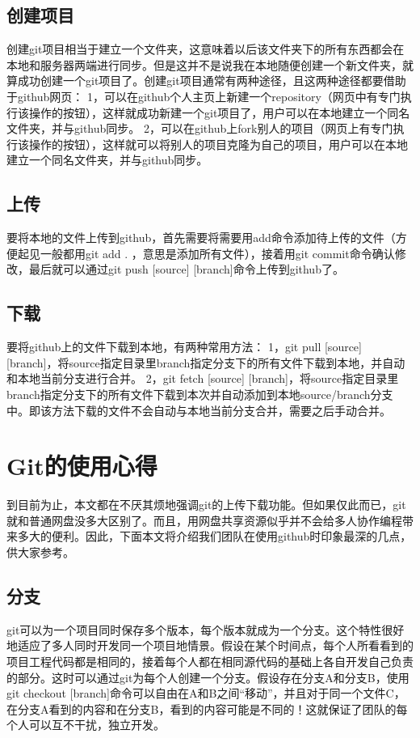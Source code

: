 \documentclass [a4paper,11pt]{article}
\begin{document}
\subsection{创建项目}
       创建git项目相当于建立一个文件夹，这意味着以后该文件夹下的所有东西都会在本地和服务器两端进行同步。但是这并不是说我在本地随便创建一个新文件夹，就算成功创建一个git项目了。创建git项目通常有两种途径，且这两种途径都要借助于github网页：
        1，可以在github个人主页上新建一个repository（网页中有专门执行该操作的按钮），这样就成功新建一个git项目了，用户可以在本地建立一个同名文件夹，并与github同步。
        2，可以在github上fork别人的项目（网页上有专门执行该操作的按钮），这样就可以将别人的项目克隆为自己的项目，用户可以在本地建立一个同名文件夹，并与github同步。

\subsection{上传}
       要将本地的文件上传到github，首先需要将需要用add命令添加待上传的文件（方便起见一般都用git add . ，意思是添加所有文件），接着用git commit命令确认修改，最后就可以通过git push [source] [branch]命令上传到github了。

\subsection{下载}
       要将github上的文件下载到本地，有两种常用方法：
       1，git pull [source] [branch]，将source指定目录里branch指定分支下的所有文件下载到本地，并自动和本地当前分支进行合并。
       2，git fetch [source] [branch]，将source指定目录里branch指定分支下的所有文件下载到本次并自动添加到本地source/branch分支中。即该方法下载的文件不会自动与本地当前分支合并，需要之后手动合并。

\section{Git的使用心得}
      到目前为止，本文都在不厌其烦地强调git的上传下载功能。但如果仅此而已，git就和普通网盘没多大区别了。而且，用网盘共享资源似乎并不会给多人协作编程带来多大的便利。因此，下面本文将介绍我们团队在使用github时印象最深的几点，供大家参考。
  
\subsection{分支}
git可以为一个项目同时保存多个版本，每个版本就成为一个分支。这个特性很好地适应了多人同时开发同一个项目地情景。假设在某个时间点，每个人所看看到的项目工程代码都是相同的，接着每个人都在相同源代码的基础上各自开发自己负责的部分。这时可以通过git为每个人创建一个分支。假设存在分支A和分支B，使用git checkout [branch]命令可以自由在A和B之间“移动”，并且对于同一个文件C，在分支A看到的内容和在分支B，看到的内容可能是不同的！这就保证了团队的每个人可以互不干扰，独立开发。
\end{document}
